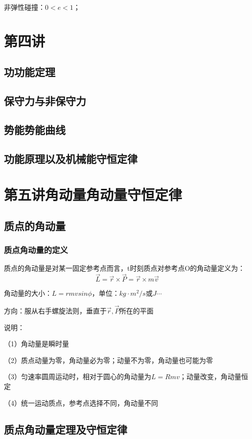 \documentclass[UTF8]{article}
\begin{document}
    非弹性碰撞：$0<e<1$；

\newpage
\section{第四讲\;\;}
\subsection{功\;\;功能定理}
\subsection{保守力与非保守力}
\subsection{势能\;\;势能曲线}
\subsection{功能原理以及机械能守恒定律}
\newpage
\section{第五讲\;\;角动量\;\;角动量守恒定律}
\subsection{质点的角动量}
\subsubsection{质点角动量的定义}

    质点的角动量是对某一固定参考点而言，t时刻质点对参考点O的角动量定义为：
    \[\vec{L} = \vec{r}\times\vec{P} = \vec{r}\times m\vec{v}\]

    角动量的大小：$L = rmvsin\phi$，单位：$kg\cdot m^2/s$或$J\cdots$

    方向：服从右手螺旋法则，垂直于$\vec{r},\vec{P}$所在的平面

    说明：

    （1）角动量是瞬时量

    （2）质点动量为零，角动量必为零；动量不为零，角动量也可能为零

    （3）匀速率圆周运动时，相对于圆心的角动量为$L = Rmv$；动量改变，角动量恒定

    （4）统一运动质点，参考点选择不同，角动量不同

\subsection{质点角动量定理及守恒定律}
\end{document}
